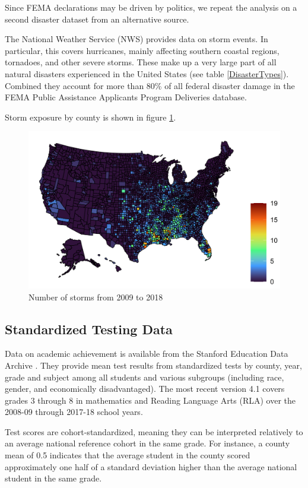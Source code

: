 Since FEMA declarations may be driven by politics, we repeat the analysis on a second disaster dataset from an alternative source.

The National Weather Service (NWS) provides data on storm events. In particular, this covers hurricanes, mainly affecting southern coastal regions, tornadoes, and other severe storms. These make up a very large part of all natural disasters experienced in the United States (see table \ref{DisasterTypes}). Combined they account for more than 80\% of all federal disaster damage in the FEMA Public Assistance Applicants Program Deliveries database.

Storm exposure by county is shown in figure \ref{StormMap}.

\begin{figure}[!h]
	\centering
	\includegraphics[scale=1]{"../Code & Data/StormMap.png"}
	\caption{Number of storms from 2009 to 2018}
	\label{StormMap}
\end{figure}


\subsection{Standardized Testing Data}

Data on academic achievement is available from the Stanford Education Data Archive \citep{SEDA}. They provide mean test results from standardized tests by county, year, grade and subject among all students and various subgroups (including race, gender, and economically disadvantaged). The most recent version 4.1 covers grades 3 through 8 in mathematics and Reading Language Arts (RLA) over the 2008-09 through 2017-18 school years.

Test scores are cohort-standardized, meaning they can be interpreted relatively to an average national reference cohort in the same grade. For instance, a county mean of 0.5 indicates that the average student in the county scored approximately one half of a standard deviation higher than the average national student in the same grade.

